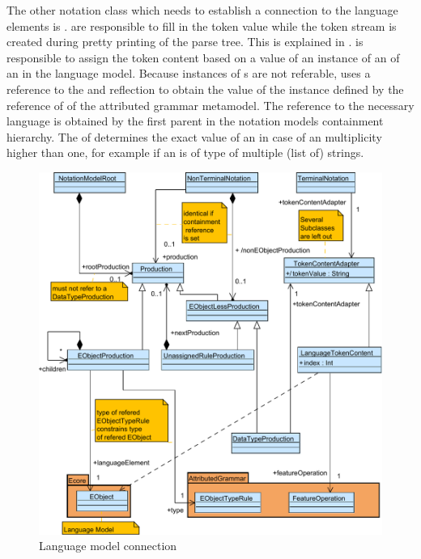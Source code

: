 The other notation class which needs to establish a connection to the language elements is .  are responsible to fill in the token value while the token stream is created during pretty printing of the parse tree. This is explained in .  is responsible to assign the token content based on a value of an instance of an  of an  in the language model. Because instances of s are not referable,  uses a reference to the  and reflection to obtain the value of the  instance defined by the  reference of  of the attributed grammar metamodel. The reference to the necessary language  is obtained by the first parent  in the notation models containment hierarchy. The  of  determines the exact value of an  in case of an multiplicity higher than one, for example if an  is of type of multiple (list of) strings.

\begin{figure}
\centering
\includegraphics[scale=0.8]{gfx/ex/Notation_LangRel} 
\caption{Language model connection}
\label{MM:Not:LR}
\end{figure}

